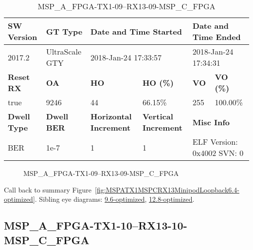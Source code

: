 \begin{table}[h]
\centering
\caption{MSP\_A\_FPGA-TX1-09--RX13-09-MSP\_C\_FPGA}
\label{tab:MSPAFPGATX109RX1309MSPCFPGA6.4-optimized}
\begin{tabular}{@{}|l|l|l|l|l|l|@{}}
\toprule
\textbf{SW Version}                & \textbf{GT Type}   & \multicolumn{2}{l|}{\textbf{Date and Time Started}}            & \multicolumn{2}{l|}{\textbf{Date and Time Ended}}        \\ \midrule
2017.2                       & UltraScale GTY          & \multicolumn{2}{l|}{2018-Jan-24 17:33:57}                   & \multicolumn{2}{l|}{2018-Jan-24 17:34:31}               \\ \midrule
\textbf{Reset RX}                  & \textbf{OA} & \textbf{HO}   & \textbf{HO (\%)} & \textbf{VO} & \textbf{VO (\%)} \\ \midrule
true & 9246        & 44          & 66.15\%        & 255        & 100.00\%       \\ \midrule
\textbf{Dwell Type}                & \textbf{Dwell BER} & \textbf{Horizontal Increment} & \textbf{Vertical Increment}    & \multicolumn{2}{l|}{\textbf{Misc Info}}                  \\ \midrule
BER                            & 1e-7        & 1        & 1           & \multicolumn{2}{l|}{ELF Version: 0x4002 SVN: 0}                         \\ \bottomrule
\end{tabular}
\end{table}

\begin{figure}[h]
\caption{MSP\_A\_FPGA-TX1-09--RX13-09-MSP\_C\_FPGA} \label{fig:MSPAFPGATX109RX1309MSPCFPGA6.4-optimized}
\end{figure}

Call back to summary Figure~\ref{fig:MSPATX1MSPCRX13MinipodLoopback6.4-optimized}.
Sibling eye diagrams: \hyperref[sec:MSPAFPGATX109RX1309MSPCFPGA9.6-optimized]{9.6-optimized}, \hyperref[sec:MSPAFPGATX109RX1309MSPCFPGA12.8-optimized]{12.8-optimized}.

\clearpage
\newpage


\subsection{MSP\_A\_FPGA-TX1-10--RX13-10-MSP\_C\_FPGA}\label{sec:MSPAFPGATX110RX1310MSPCFPGA6.4-optimized}

